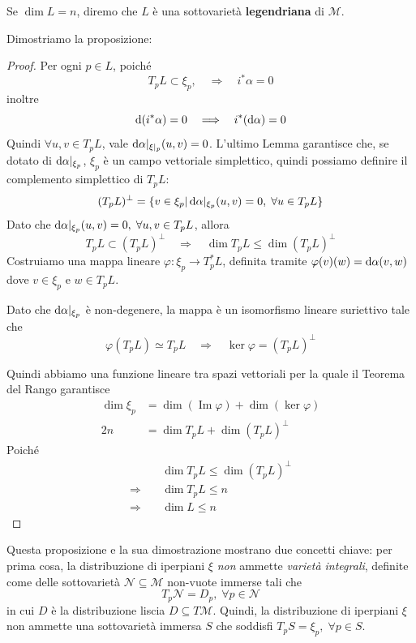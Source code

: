 \begin{definition}
    Se $\dim L = n$, diremo che $L$ è una sottovarietà \textbf{legendriana} di $\mathcal{M}$.
\end{definition}

Dimostriamo la proposizione:
\begin{proof}
    \cite{geiges_contact} Per ogni $p \in L$, poiché \[
        T_p L \subset \xi_p, \quad \Longrightarrow \quad i^* \alpha = 0
    \]
    inoltre \[
        \odif{(i^*\alpha)} = 0 \quad \Longrightarrow \quad i^* (\odif{\alpha}) = 0
    \] Quindi \( \forall u,v \in T_p L \), vale \( \odif{\alpha}|_{\xi|_p} (u,v) = 0 \). L'ultimo Lemma garantisce che, se dotato di $\odif{\alpha}|_{\xi_p}$, $\xi_p$ è un campo vettoriale simplettico, quindi possiamo definire il complemento simplettico di $T_p L$:
    \[
        (T_p L)^\perp = \{ v \in \xi_p | \odif{\alpha}|_{\xi_p} (u,v)= 0, \; \forall u \in T_p L \}
    \]
    Dato che \(  \odif{\alpha}|_{\xi_p} (u,v)= 0, \; \forall u, v \in T_p L  \), allora
    \[
        T_p L \subset (T_p L)^\perp \quad \Longrightarrow \quad \dim T_p L \leq \dim (T_p L)^\perp
    \]
    Costruiamo una mappa lineare \( \varphi : \xi_p \longrightarrow T_p^* L \), definita tramite \( \varphi (v)(w) = \odif{\alpha} (v, w)\) dove $v \in \xi_p$ e $w \in T_p L$.

    Dato che $\odif{\alpha}|_{\xi_p}$ è non-degenere, la mappa è un isomorfismo lineare suriettivo tale che
    \[
        \varphi(T_p L) \simeq T_p L \quad \Longrightarrow \quad \ker \varphi = (T_p L)^\perp
    \]

    Quindi abbiamo una funzione lineare tra spazi vettoriali per la quale il Teorema del Rango garantisce
    \begin{align*}
        \dim \xi_p & = \dim( \operatorname{Im} \varphi) + \dim( \ker \varphi) \\
        2 n        & = \dim T_p L + \dim (T_p L )^\perp
    \end{align*}
    Poiché \begin{align*}
                              & \dim T_p L \leq \dim (T_p L)^\perp \\
        \Longrightarrow \quad & \dim T_p L \leq n                  \\
        \Longrightarrow \quad & \dim L \leq n
    \end{align*}
\end{proof}

Questa proposizione e la sua dimostrazione mostrano due concetti chiave: per prima cosa, la distribuzione di iperpiani $\xi$ \emph{non} ammette \emph{varietà integrali}, definite \cite[Chapter 19]{lee_manifolds} come delle sottovarietà $\mathcal{N} \subseteq \mathcal{M}$ non-vuote immerse tali che
\[
    T_p \mathcal{N} = D_p, \; \forall p \in \mathcal{N}
\]
in cui $D$ è la distribuzione liscia $D \subseteq T \mathcal{M}$.
Quindi, la distribuzione di iperpiani $\xi$ non ammette una sottovarietà immersa $S$ che soddisfi $T_p S = \xi_p, \; \forall p \in S$.

